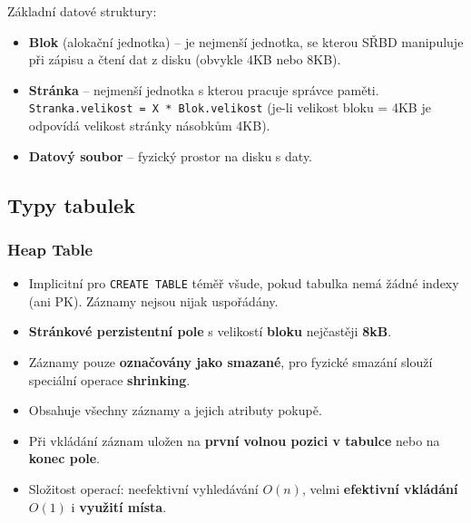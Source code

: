 Základní datové struktury:
\begin{itemize}
\item \textbf{Blok} (alokační jednotka) -- je nejmenší jednotka, se kterou SŘBD manipuluje při zápisu a čtení dat z disku (obvykle 4KB nebo 8KB).
\item \textbf{Stránka} -- nejmenší jednotka s kterou pracuje správce paměti. \texttt{Stranka.velikost = X * Blok.velikost} (je-li velikost bloku = 4KB je odpovídá velikost stránky násobkům 4KB).
\item \textbf{Datový soubor} -- fyzický prostor na disku s daty.
\end{itemize}


\subsection{Typy tabulek}
\subsubsection{Heap Table}
\begin{itemize}
\item Implicitní pro \texttt{CREATE TABLE} téměř všude, pokud tabulka nemá žádné indexy (ani PK). Záznamy nejsou nijak uspořádány.
\item \textbf{Stránkové perzistentní pole} s velikostí \textbf{bloku} nejčastěji \textbf{8kB}.
\item Záznamy pouze \textbf{označovány jako smazané}, pro fyzické smazání slouží speciální operace \textbf{shrinking}.
\item Obsahuje všechny záznamy a jejich atributy pokupě.
\item Při vkládání záznam uložen na \textbf{první volnou pozici v tabulce} nebo na \textbf{konec pole}.
\item Složitost operací: neefektivní vyhledávání $O(n)$, velmi \textbf{efektivní vkládání} $O(1)$ i \textbf{využití místa}.
\end{itemize}

